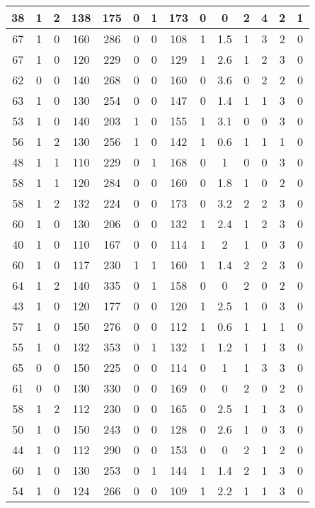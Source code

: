 \documentclass{article}
\begin{document}
\begin{longtable}{|c|c|c|c|c|c|c|c|c|c|c|c|c|c|}
\hline
38 & 1 & 2 & 138 & 175 & 0 & 1 & 173 & 0 & 0 & 2 & 4 & 2 & 1\\
\hline
67 & 1 & 0 & 160 & 286 & 0 & 0 & 108 & 1 & 1.5 & 1 & 3 & 2 & 0\\
\hline
67 & 1 & 0 & 120 & 229 & 0 & 0 & 129 & 1 & 2.6 & 1 & 2 & 3 & 0\\
\hline
62 & 0 & 0 & 140 & 268 & 0 & 0 & 160 & 0 & 3.6 & 0 & 2 & 2 & 0\\
\hline
63 & 1 & 0 & 130 & 254 & 0 & 0 & 147 & 0 & 1.4 & 1 & 1 & 3 & 0\\
\hline
53 & 1 & 0 & 140 & 203 & 1 & 0 & 155 & 1 & 3.1 & 0 & 0 & 3 & 0\\
\hline
56 & 1 & 2 & 130 & 256 & 1 & 0 & 142 & 1 & 0.6 & 1 & 1 & 1 & 0\\
\hline
48 & 1 & 1 & 110 & 229 & 0 & 1 & 168 & 0 & 1 & 0 & 0 & 3 & 0\\
\hline
58 & 1 & 1 & 120 & 284 & 0 & 0 & 160 & 0 & 1.8 & 1 & 0 & 2 & 0\\
\hline
58 & 1 & 2 & 132 & 224 & 0 & 0 & 173 & 0 & 3.2 & 2 & 2 & 3 & 0\\
\hline
60 & 1 & 0 & 130 & 206 & 0 & 0 & 132 & 1 & 2.4 & 1 & 2 & 3 & 0\\
\hline
40 & 1 & 0 & 110 & 167 & 0 & 0 & 114 & 1 & 2 & 1 & 0 & 3 & 0\\
\hline
60 & 1 & 0 & 117 & 230 & 1 & 1 & 160 & 1 & 1.4 & 2 & 2 & 3 & 0\\
\hline
64 & 1 & 2 & 140 & 335 & 0 & 1 & 158 & 0 & 0 & 2 & 0 & 2 & 0\\
\hline
43 & 1 & 0 & 120 & 177 & 0 & 0 & 120 & 1 & 2.5 & 1 & 0 & 3 & 0\\
\hline
57 & 1 & 0 & 150 & 276 & 0 & 0 & 112 & 1 & 0.6 & 1 & 1 & 1 & 0\\
\hline
55 & 1 & 0 & 132 & 353 & 0 & 1 & 132 & 1 & 1.2 & 1 & 1 & 3 & 0\\
\hline
65 & 0 & 0 & 150 & 225 & 0 & 0 & 114 & 0 & 1 & 1 & 3 & 3 & 0\\
\hline
61 & 0 & 0 & 130 & 330 & 0 & 0 & 169 & 0 & 0 & 2 & 0 & 2 & 0\\
\hline
58 & 1 & 2 & 112 & 230 & 0 & 0 & 165 & 0 & 2.5 & 1 & 1 & 3 & 0\\
\hline
50 & 1 & 0 & 150 & 243 & 0 & 0 & 128 & 0 & 2.6 & 1 & 0 & 3 & 0\\
\hline
44 & 1 & 0 & 112 & 290 & 0 & 0 & 153 & 0 & 0 & 2 & 1 & 2 & 0\\
\hline
60 & 1 & 0 & 130 & 253 & 0 & 1 & 144 & 1 & 1.4 & 2 & 1 & 3 & 0\\
\hline
54 & 1 & 0 & 124 & 266 & 0 & 0 & 109 & 1 & 2.2 & 1 & 1 & 3 & 0\\

\end{longtable}
\end{document}
